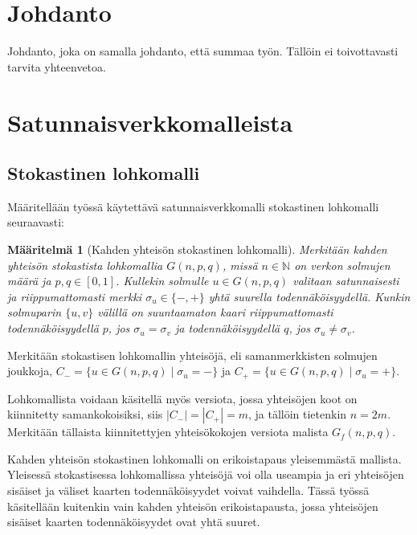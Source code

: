 \documentclass[finnish,12pt,a4paper,pdftex,sci,utf8]{aaltothesis}
\newtheorem{definition}{Määritelmä}
\begin{document}
\section{Johdanto}
Johdanto, joka on samalla johdanto, että summaa työn. Tällöin ei toivottavasti tarvita yhteenvetoa.
\thispagestyle{empty}

\clearpage

\section{Satunnaisverkkomalleista}

\subsection{Stokastinen lohkomalli}
Määritellään työssä käytettävä satunnaisverkkomalli stokastinen lohkomalli seuraavasti:

\begin{definition}[Kahden yhteisön stokastinen lohkomalli]
	Merkitään kahden yhteisön stokastista lohkomallia $G(n,p,q)$, missä $n \in \mathbb{N}$ on verkon solmujen määrä ja $p,q \in [0,1]$.  Kullekin solmulle $u \in G(n,p,q)$ valitaan satunnaisesti ja riippumattomasti merkki $\sigma_u \in \{-, +\}$ yhtä suurella todennäköisyydellä. Kunkin solmuparin $\{u,v\}$ välillä on suuntaamaton kaari riippumattomasti todennäköisyydellä $p$, jos $\sigma_u = \sigma_v$ ja todennäköisyydellä $q$, jos $\sigma_u \neq \sigma_v$.
\end{definition}

Merkitään stokastisen lohkomallin yhteisöjä, eli samanmerkkisten solmujen joukkoja, $C_- = \{u \in G(n,p,q) \mid \sigma_u = -\}$ ja $C_+ = \{u \in G(n,p,q) \mid \sigma_u = +\}$.

Lohkomallista voidaan käsitellä myös versiota, jossa yhteisöjen koot on kiinnitetty samankokoisiksi, siis $|C_-| = |C_+| = m$, ja tällöin tietenkin $n = 2m$. Merkitään tällaista kiinnitettyjen yhteisökokojen versiota malista $G_f(n,p,q)$.

Kahden yhteisön stokastinen lohkomalli on erikoistapaus yleisemmästä mallista. Yleisessä stokastisessa lohkomallissa yhteisöjä voi olla useampia ja eri yhteisöjen sisäiset ja väliset kaarten todennäköisyydet voivat vaihdella. Tässä työssä käsitellään kuitenkin vain kahden yhteisön erikoistapausta, jossa yhteisöjen sisäiset kaarten todennäköisyydet ovat yhtä suuret.
\end{document}
